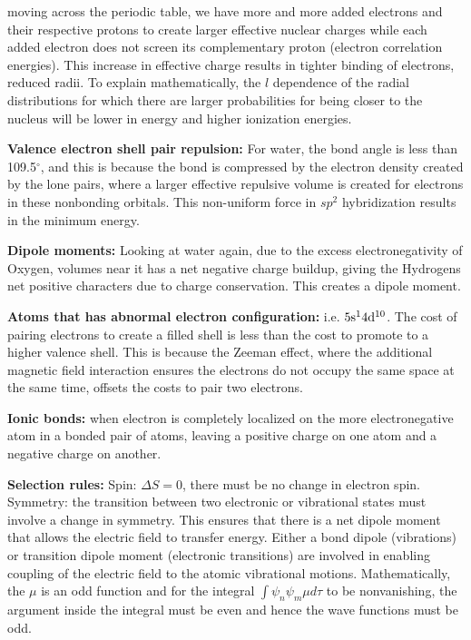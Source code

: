 \documentclass[11pt,fleqn]{book}
\begin{document}
moving across the periodic table, we have more and more added electrons and their respective protons to create larger effective nuclear charges while each added electron does not screen its complementary proton (electron correlation energies). This increase in effective charge results in tighter binding of electrons, reduced radii. To explain mathematically, the $l$ dependence of the radial distributions for which there are larger probabilities for being closer to the nucleus will be lower in energy and higher ionization energies.

\textbf{Valence electron shell pair repulsion: }For water, the bond angle is less than 109.5$^\circ$, and this is because the bond is compressed by the electron density created by the lone pairs, where a larger effective repulsive volume is created for electrons in these nonbonding orbitals. This non-uniform force in $sp^2$ hybridization results in the minimum energy.

\textbf{Dipole moments: }Looking at water again, due to the excess electronegativity  of Oxygen, volumes near it has a net negative charge buildup, giving the Hydrogens net positive characters due to charge conservation. This creates a dipole moment.

\textbf{Atoms that has abnormal electron configuration: }i.e. $\rm 5s^14d^{10}$. The cost of pairing electrons to create a filled shell is less than the cost to promote to a higher valence shell. This is because the Zeeman effect, where the additional magnetic field interaction ensures the electrons do not occupy the same space at the same time, offsets the costs to pair two electrons. 

\textbf{Ionic bonds: }when electron is completely localized on the more electronegative atom in a bonded pair of atoms, leaving a positive charge on one atom and a negative charge on another.

\textbf{Selection rules: } Spin: $\Delta S=0$, there must be no change in electron spin. Symmetry: the transition between two electronic or vibrational states must involve a change in symmetry. This ensures that there is a net dipole moment that allows the electric field to transfer energy. Either a bond dipole (vibrations) or transition dipole moment (electronic transitions) are involved in enabling coupling of the electric field to the atomic vibrational motions. Mathematically, the $\mu$ is an odd function and for the integral $\int\psi_n\psi_m\mu d\tau$ to be nonvanishing, the argument inside the integral must be even and hence the wave functions must be odd.
\end{document}
